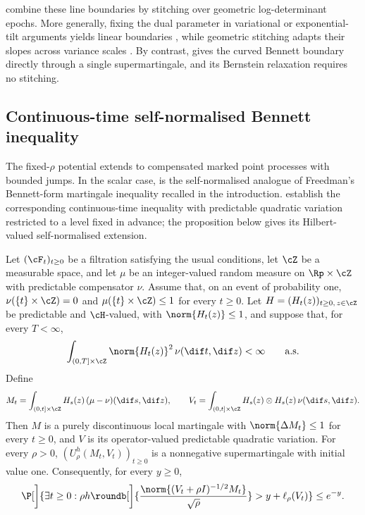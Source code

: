 \documentclass[11pt]{article}
\let\cref\zcref
\begin{document}
\citet{chugg2025variational} combine these line boundaries by stitching over geometric log-determinant epochs. More generally, fixing the dual parameter in variational or exponential-tilt arguments yields linear boundaries \citep{howard2020timeuniform}, while geometric stitching adapts their slopes across variance scales \citep{howard2021timeuniform}. By contrast, \cref{thm:bennett-logdet-potential} gives the curved Bennett boundary directly through a single supermartingale, and its Bernstein relaxation requires no stitching.


\subsection{Continuous-time self-normalised Bennett inequality}
\label{sec:continuous-bounded-jumps}

The fixed-$\rho$ potential extends to compensated marked point processes with bounded jumps. In the scalar case, \cref{cor:bennett} is the self-normalised analogue of Freedman's Bennett-form martingale inequality recalled in the introduction. \citet[Cor.~3.4(iii)]{dzhaparidze2001bernstein} establish the corresponding continuous-time inequality with predictable quadratic variation restricted to a level fixed in advance; the proposition below gives its Hilbert-valued self-normalised extension.

\begin{proposition}[restate=continuousBoundedJumps,name=]\label{prop:continuous-bounded-jumps}
Let $(\cF_t)_{t\geq0}$ be a filtration satisfying the usual conditions, let $\cZ$ be a measurable space, and let $\mu$ be an integer-valued random measure on $\Rp\times\cZ$ with predictable compensator $\nu$. Assume that, on an event of probability one, $\nu(\{t\}\times\cZ)=0$ and $\mu(\{t\}\times\cZ)\leq1$ for every $t\geq0$. Let $H=(H_t(z))_{t\geq0,\,z\in\cZ}$ be predictable and $\cH$-valued, with $\norm{H_t(z)}\leq1$, and suppose that, for every $T<\infty$,
\[
  \int_{(0,T]\times\cZ}\norm{H_t(z)}^2\,\nu(\dif t,\dif z)<\infty \qquad\text{a.s.}
\]
Define
\[
  M_t=\int_{(0,t]\times\cZ}H_s(z)\,(\mu-\nu)(\dif s,\dif z), \qquad V_t=\int_{(0,t]\times\cZ}H_s(z)\otimes H_s(z)\,\nu(\dif s,\dif z).
\]
Then $M$ is a purely discontinuous local martingale with $\norm{\Delta M_t}\leq1$ for every $t\geq0$, and $V$ is its operator-valued predictable quadratic variation. For every $\rho>0$, $(U_\rho^h(M_t,V_t))_{t\geq0}$ is a nonnegative supermartingale with initial value one. Consequently, for every $y\geq0$,
\[
  \P[\bigg]{\exists t\geq0:\rho h\roundb[\bigg]{\frac{\norm{(V_t+\rho I)^{-1/2}M_t}}{\sqrt\rho}}>y+\ell_\rho(V_t)}\leq e^{-y}.
\]
\end{proposition}
\end{document}
